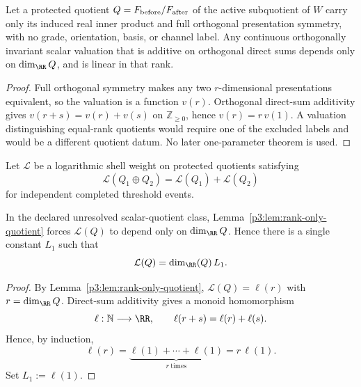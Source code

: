 \documentclass[11pt,a4paper]{article}
\begin{document}
\begin{lemma}
\label{p3:lem:rank-only-quotient}
Let a protected quotient \(Q=F_{\rm before}/F_{\rm after}\) of the active
subquotient of \(W\) carry only its induced real inner product and
full orthogonal presentation symmetry, with no grade, orientation, basis, or
channel label.  Any continuous orthogonally invariant scalar valuation that
is additive on orthogonal direct sums depends only on
\(\dim_{\RR}Q\), and is linear in that rank.
\end{lemma}

\begin{proof}
Full orthogonal symmetry makes any two \(r\)-dimensional presentations
equivalent, so the valuation is a function \(v(r)\).  Orthogonal direct-sum
additivity gives \(v(r+s)=v(r)+v(s)\) on
\(\mathbb Z_{\ge0}\), hence \(v(r)=r\,v(1)\).  A valuation distinguishing
equal-rank quotients would require one of the excluded labels and would be a
different quotient datum.  No later one-parameter theorem is used.
\end{proof}



\begin{lemma}
\label{p3:lem:additive-rank-valuation}
Let \(\mathcal L\) be a logarithmic shell weight on protected quotients
satisfying
\[
\mathcal L(Q_1\oplus Q_2)=\mathcal L(Q_1)+\mathcal L(Q_2)
\]
for independent completed threshold events.

In the declared unresolved scalar-quotient class, Lemma~\ref{p3:lem:rank-only-quotient}
forces \(\mathcal L(Q)\) to depend only on \(\dim_{\RR}Q\).  Hence there is a
single constant \(L_1\) such that
\[
\mathcal L(Q)=\dim_{\RR}(Q)\,L_1 .
\]
\end{lemma}

\begin{proof}
By Lemma~\ref{p3:lem:rank-only-quotient}, \(\mathcal L(Q)=\ell(r)\) with
\(r=\dim_{\RR}Q\).  Direct-sum additivity gives a monoid homomorphism
\[
\ell:\mathbb N\longrightarrow \RR,
\qquad
\ell(r+s)=\ell(r)+\ell(s).
\]
Hence, by induction,
\[
\ell(r)=\underbrace{\ell(1)+\cdots+\ell(1)}_{r\ \mathrm{times}}
=r\,\ell(1).
\]
Set \(L_1:=\ell(1)\).
\end{proof}
\end{document}
